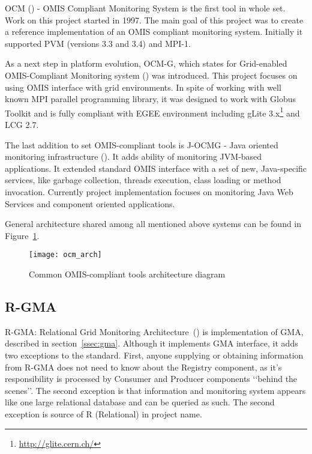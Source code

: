 OCM (\cite{RWspdt98, RW:ppam99b}) - OMIS Compliant Monitoring System is the first tool in whole set. Work on this project started in 1997. The main goal of this project was to create a reference implementation of an OMIS compliant monitoring system. Initially it supported PVM (versions 3.3 and 3.4) and MPI-1. 

As a next step in platform evolution, OCM-G, which states for Grid-enabled OMIS-Compliant Monitoring system (\cite{axgrid03b}) was introduced. This project focuses on using OMIS interface with grid environments.  In spite of working with well known MPI parallel programming library, it was designed to work with Globus Toolkit and is fully compliant with EGEE environment including gLite 3.x\footnote{\url{http://glite.cern.ch/}} and LCG 2.7. 

The last addition to set OMIS-compliant tools is J-OCMG - Java oriented monitoring infrastructure (\cite{jocm}). It adds ability of monitoring JVM-based applications. It extended standard OMIS interface with a set of new, Java-specific services, like garbage collection, threads execution, class loading or method invocation. Currently project implementation focuses on monitoring Java Web Services and component oriented applications.

General architecture shared among all mentioned above systems can be found in Figure~\ref{fig:ocmg}.

\begin{figure}[ht]
  \centering
  \texttt{[image: ocm\_arch]}
  \caption{Common OMIS-compliant tools architecture diagram}
  \label{fig:ocmg}
\end{figure}
 
\subsection{R-GMA}

R-GMA: Relational Grid Monitoring Architecture~(\cite{RGMA1,RGMA2,RGMA3}) is implementation of GMA, described in section~\ref{ssec:gma}. Although it implements GMA interface, it adds two exceptions to the standard. First, anyone supplying or obtaining information from R-GMA does not need to know about the Registry component, as it\rq{}s responsibility is processed by Consumer and Producer components \lq\lq{}behind the scenes\rq\rq{}. The second exception is that information and monitoring system appears like one large relational database and can be queried as such. The second exception is source of R (Relational) in project name.

